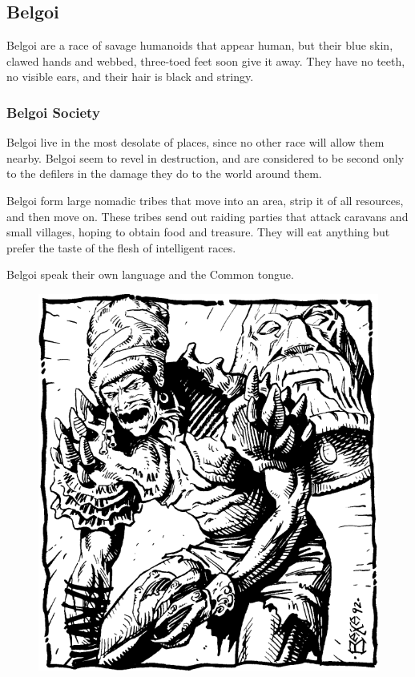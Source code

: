 \subsection{Belgoi}
Belgoi are a race of savage humanoids that appear human, but their blue skin, clawed hands and webbed, three-toed feet soon give it away. They have no teeth, no visible ears, and their hair is black and stringy.

\subsubsection{Belgoi Society}
Belgoi live in the most desolate of places, since no other race will allow them nearby. Belgoi seem to revel in destruction, and are considered to be second only to the defilers in the damage they do to the world around them.

Belgoi form large nomadic tribes that move into an area, strip it of all resources, and then move on. These tribes send out raiding parties that attack caravans and small villages, hoping to obtain food and treasure. They will eat anything but prefer the taste of the flesh of intelligent races.

Belgoi speak their own language and the Common tongue.

\begin{figure}[t!]
\centering
\includegraphics[width=\columnwidth]{images/belgoi.png}
\WOTC
\end{figure}

